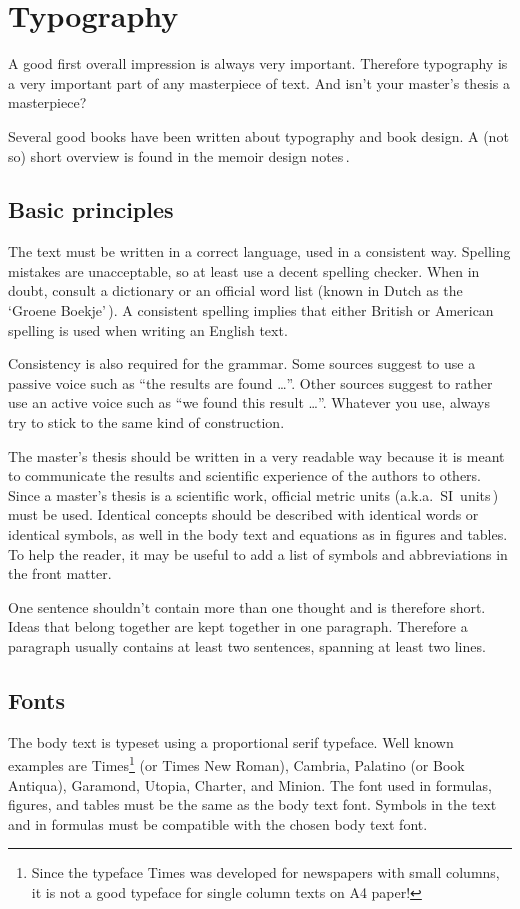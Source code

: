 \documentclass[11pt,article,oneside,a4paper]{memoir}
\newcommand\Dutch[1]{`\foreignlanguage{dutch}{#1}'}
\begin{document}
\chapter{Typography}
A good first overall impression is always very important. Therefore
typography is a very important part of any masterpiece of text. And isn't
your master's thesis a masterpiece?

Several good books have been written about typography and book design. A
(not so) short overview is found in the memoir design notes\,\cite{memdesign}.

\section{Basic principles}
The text must be written in a correct language, used in a consistent way.
Spelling mistakes are unacceptable, so at least use a decent spelling
checker. When in doubt, consult a dictionary or an official word list
(known in Dutch as the \Dutch{Groene Boekje}\,\cite{grboek}). A consistent
spelling implies that either British or American spelling is used when
writing an English text.

Consistency is also required for the grammar. Some sources suggest to use a
passive voice such as ``the results are found \ldots''. Other sources
suggest to rather use an active voice such as ``we found this result
\ldots''. Whatever you use, always try to stick to the same kind of
construction.

The master's thesis should be written in a very readable way because it is
meant to communicate the results and scientific experience of the authors
to others.
Since a master's thesis is a scientific work, official metric units (a.k.a.\
SI~units\,\cite{siunits}) must be used.
Identical concepts should be described with identical words or identical
symbols, as well in the body text and equations as in figures and tables.
To help the reader, it may be useful to add a list of symbols and
abbreviations in the front matter.

One sentence shouldn't contain more than one thought and is
therefore short. Ideas that belong together are kept together in one
paragraph. Therefore a paragraph usually contains at least two sentences,
spanning at least two lines.

\section{Fonts}
The body text is typeset using a proportional serif typeface. Well known
examples are Times\footnote{Since the typeface Times was developed for
  newspapers with small columns, it is not a good typeface for single
  column texts on A4 paper!} (or Times New Roman), Cambria, Palatino (or
Book Antiqua), Garamond, Utopia, Charter, and Minion. The font used in
formulas, figures, and tables must be the same as the body text font.
Symbols in the text and in formulas must be compatible with the chosen body
text font.
\end{document}
